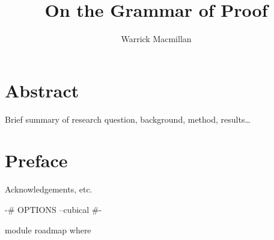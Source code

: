 \documentclass[11pt, a4paper]{article}
\title{On the Grammar of Proof}
\author{Warrick Macmillan}
\begin{document}
\begin{titlepage}

\maketitle
\thispagestyle{empty}
\end{titlepage}

\newpage
\singlespacing
\section*{Abstract}

Brief summary of research question, background, method, results\ldots

\thispagestyle{empty}

\newpage
\section*{Preface}

Acknowledgements, etc.

\thispagestyle{empty}

\newpage

\begin{spacing}{0.0}
\tableofcontents
\end{spacing}

\thispagestyle{empty}

\newpage
\setcounter{page}{1}

\begin{code}[hide]
{-# OPTIONS --cubical #-}

module roadmap where
\end{code}
\end{document}
